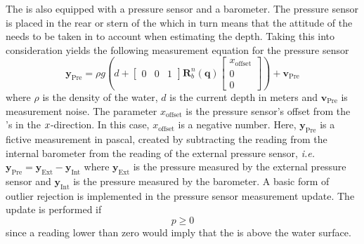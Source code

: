 The \abbrROV is also equipped with a pressure sensor and a barometer. The pressure sensor is placed in the rear or stern of the \abbrROV which in turn means that the attitude of the \abbrROV needs to be taken in to account when estimating the depth.
Taking this into consideration yields the following measurement equation for the pressure sensor
\begin{equation}
 \boldsymbol{y}_{\text{Pre}}=  \rho g \left(d + \begin{bmatrix}
    0 & 0 & 1
\end{bmatrix} \boldsymbol{R}^n_b(\boldsymbol{q}) 
\begin{bmatrix}
x_{\text{offset}}\\
0\\
0
\end{bmatrix}\right)
    + \boldsymbol{v}_{\text{Pre}}
\end{equation}
where $\rho$ is the density of the water, $d$ is the current depth in meters and $\boldsymbol{v}_{\text{Pre}}$ is measurement noise. The parameter $x_{\text{offset}}$ is the pressure sensor's offset from the \abbrROV's \abbrCO in the $x$-direction. In this case, $x_{\textrm{offset}}$ is a negative number. Here, $\boldsymbol{y}_{\text{Pre}}$ is a fictive measurement in pascal, created by subtracting the reading from the internal barometer from the reading of the external pressure sensor, \emph{i.e.} $\boldsymbol{y}_{\text{Pre}} =\boldsymbol{y}_{\text{Ext}} - \boldsymbol{y}_{\text{Int}}$ where $\boldsymbol{y}_{\text{Ext}}$ is the pressure measured by the external pressure sensor and $\boldsymbol{y}_{\text{Int}}$ is the pressure measured by the barometer. A basic form of outlier rejection is implemented in the pressure sensor measurement update. The update is performed if \begin{equation}
    p \geq 0
\end{equation}
since a reading lower than zero would imply that the \abbrROV is above the water surface.